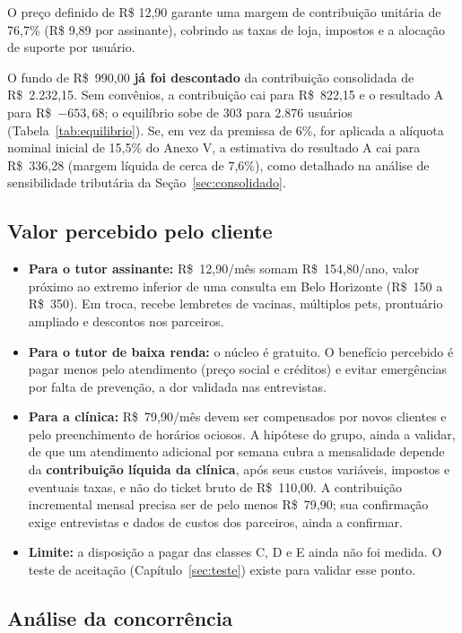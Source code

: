 O preço definido de R\$ 12,90 garante uma margem de contribuição unitária de 76,7\% (R\$ 9,89 por assinante), cobrindo as taxas de loja, impostos e a alocação de suporte por usuário.

O fundo de R\$~990,00 \textbf{já foi descontado} da contribuição consolidada de R\$~2.232,15.
Sem convênios, a contribuição cai para R\$~822,15 e o resultado A para R\$~$-653{,}68$;
o equilíbrio sobe de 303 para 2.876 usuários (Tabela~\ref{tab:equilibrio}).
Se, em vez da premissa de 6\%, for aplicada a alíquota nominal inicial de 15,5\% do
Anexo V, a estimativa do resultado A cai para R\$~336,28 (margem líquida de cerca de 7,6\%),
como detalhado na análise de sensibilidade tributária da Seção~\ref{sec:consolidado}.

\subsection{Valor percebido pelo cliente}

\begin{itemize}
  \item \textbf{Para o tutor assinante:} R\$~12,90/mês somam R\$~154,80/ano, valor próximo ao
  extremo inferior de uma consulta em Belo Horizonte (R\$~150 a R\$~350). Em troca, recebe
  lembretes de vacinas, múltiplos pets, prontuário ampliado e descontos nos parceiros.
  \item \textbf{Para o tutor de baixa renda:} o núcleo é gratuito. O benefício percebido é pagar
  menos pelo atendimento (preço social e créditos) e evitar emergências por falta de prevenção,
  a dor validada nas entrevistas.
  \item \textbf{Para a clínica:} R\$~79,90/mês devem ser compensados por novos clientes e pelo
  preenchimento de horários ociosos. A hipótese do grupo, ainda a validar, de que um atendimento adicional por
  semana cubra a mensalidade depende da \textbf{contribuição líquida da clínica}, após seus
  custos variáveis, impostos e eventuais taxas, e não do ticket bruto de R\$~110,00.
  A contribuição incremental mensal precisa ser de pelo menos R\$~79,90; sua confirmação
  exige entrevistas e dados de custos dos parceiros, ainda a confirmar.
  \item \textbf{Limite:} a disposição a pagar das classes C, D e E ainda não foi medida. O teste de
  aceitação (Capítulo~\ref{sec:teste}) existe para validar esse ponto.
\end{itemize}

\subsection{Análise da concorrência}

